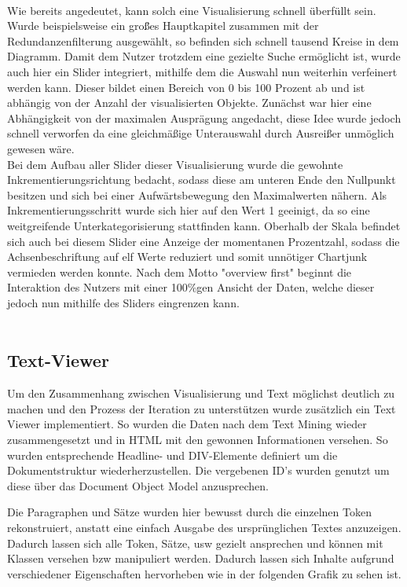 \\
Wie bereits angedeutet, kann solch eine Visualisierung schnell \"uberf\"ullt sein. Wurde beispielsweise ein gro\"{\ss}es Hauptkapitel zusammen mit der Redundanzenfilterung ausgew\"ahlt, so befinden sich schnell tausend Kreise in dem Diagramm. Damit dem Nutzer trotzdem eine gezielte Suche erm\"oglicht ist, wurde auch hier ein Slider integriert, mithilfe dem die Auswahl nun weiterhin verfeinert werden kann. Dieser bildet einen Bereich von 0 bis 100 Prozent ab und ist abh\"angig von der Anzahl der visualisierten Objekte. Zun\"achst war hier eine Abh\"angigkeit von der maximalen Auspr\"agung angedacht, diese Idee wurde jedoch schnell verworfen da eine gleichm\"a{\ss}ige Unterauswahl durch Ausrei{\ss}er unm\"oglich gewesen w\"are.\\
Bei dem Aufbau aller Slider dieser Visualisierung wurde die gewohnte Inkrementierungsrichtung bedacht, sodass diese am unteren Ende den Nullpunkt besitzen und sich bei einer Aufw\"artsbewegung den Maximalwerten n\"ahern. Als Inkrementierungsschritt wurde sich hier auf den Wert 1 geeinigt, da so eine weitgreifende Unterkategorisierung stattfinden kann. Oberhalb der Skala befindet sich auch bei diesem Slider eine Anzeige der momentanen Prozentzahl, sodass die Achsenbeschriftung auf elf Werte reduziert und somit unn\"otiger Chartjunk vermieden werden konnte. Nach dem Motto "overview first" beginnt die Interaktion des Nutzers mit einer 100\%gen Ansicht der Daten, welche dieser jedoch nun mithilfe des Sliders eingrenzen kann.\\
\\

\subsection{Text-Viewer}
Um den Zusammenhang zwischen Visualisierung und Text möglichst deutlich zu machen und den Prozess der Iteration zu unterstützen wurde zusätzlich ein Text Viewer implementiert. So wurden die Daten nach dem Text Mining wieder zusammengesetzt und in HTML mit den gewonnen Informationen versehen. So wurden entsprechende Headline- und DIV-Elemente definiert um die Dokumentstruktur wiederherzustellen. Die vergebenen ID's wurden genutzt um diese über das Document Object Model anzusprechen. 

Die Paragraphen und Sätze wurden hier bewusst durch die einzelnen Token rekonstruiert, anstatt eine einfach Ausgabe des ursprünglichen Textes anzuzeigen. Dadurch lassen sich alle Token, Sätze, usw gezielt ansprechen und können mit Klassen versehen bzw manipuliert werden. Dadurch lassen sich Inhalte aufgrund verschiedener Eigenschaften hervorheben wie in der folgenden Grafik zu sehen ist.

